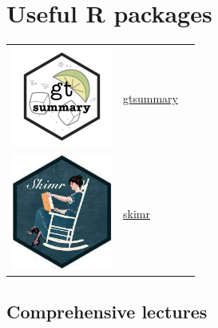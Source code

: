 \documentclass[
  letterpaper,
  DIV=11,
  numbers=noendperiod,
  oneside]{scrreprt}
\begin{document}
\hypertarget{useful-r-packages}{%
\section{Useful R packages}\label{useful-r-packages}}

\begin{longtable}[]{@{}
  >{\raggedright\arraybackslash}p{}
  >{\raggedright\arraybackslash}p{}
  >{\raggedright\arraybackslash}p{}@{}}
\toprule\noalign{}
\endhead
\bottomrule\noalign{}
\endlastfoot
\includegraphics[width=1.30208in,height=\textheight]{images/logo-01.png}
& \href{https://www.danieldsjoberg.com/gtsummary/}{gtsummary} & \\
\includegraphics[width=1.30208in,height=\textheight]{images/paste-A6E65357.png}
&
\href{https://cran.r-project.org/web/packages/skimr/vignettes/skimr.html}{skimr}
& \\
\end{longtable}

\hypertarget{comprehensive-lectures}{%
\subsection{Comprehensive lectures}\label{comprehensive-lectures}}
\end{document}
